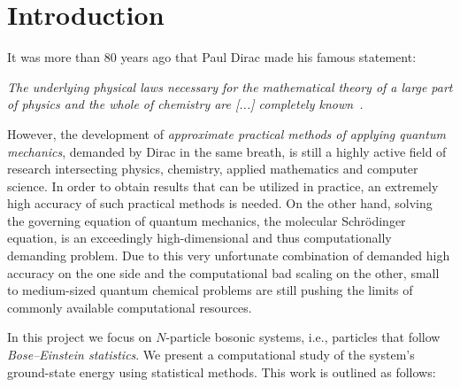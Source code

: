 \documentclass[11pt,a4paper]{article}
\numberwithin{equation}{section}
\begin{document}
\pagebreak
\tableofcontents
\listoffigures
\listoftables
\thispagestyle{empty} 

\pagebreak
\setcounter{page}{1}
\section{Introduction}
%
%
It was more than 80 years ago that Paul Dirac made his famous statement:

{\it The underlying physical laws necessary for the mathematical theory of a large part of physics and the whole of chemistry are [...] completely known~\cite{dirac1929quantum}.} 

However, the development of {\it approximate practical methods of applying quantum mechanics}, demanded by Dirac in the same breath, is still a highly active field of research intersecting physics, chemistry, applied mathematics and computer science. 
%
In order to obtain results that can be utilized in practice, an extremely high accuracy of such practical methods is needed.
%
On the other hand, solving the governing equation of quantum mechanics, the molecular Schr\"odinger equation, is an exceedingly high-dimensional and thus computationally demanding problem.
%
Due to this very unfortunate combination of demanded high accuracy on the one side and the computational bad scaling on the other, small to medium-sized quantum chemical problems are still pushing the limits of commonly available computational resources.

%
In this project we focus on $N$-particle bosonic systems, i.e., particles that follow {\it Bose--Einstein statistics}.
%
We present a computational study of the system's ground-state energy using statistical methods. 
%
This work is outlined as follows:
\end{document}
